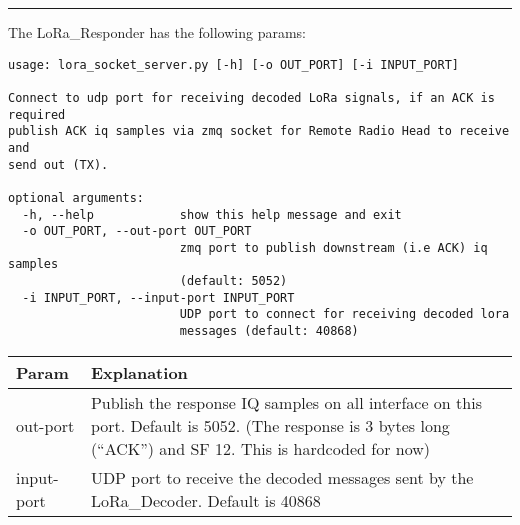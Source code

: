 \begin{center}\rule{0.5\linewidth}{\linethickness}\end{center}

The LoRa\_Responder has the following params:

\begin{verbatim}
usage: lora_socket_server.py [-h] [-o OUT_PORT] [-i INPUT_PORT]

Connect to udp port for receiving decoded LoRa signals, if an ACK is required
publish ACK iq samples via zmq socket for Remote Radio Head to receive and
send out (TX).

optional arguments:
  -h, --help            show this help message and exit
  -o OUT_PORT, --out-port OUT_PORT
                        zmq port to publish downstream (i.e ACK) iq samples
                        (default: 5052)
  -i INPUT_PORT, --input-port INPUT_PORT
                        UDP port to connect for receiving decoded lora
                        messages (default: 40868)

\end{verbatim}

\begin{longtable}[]{@{}ll@{}}
\toprule
\begin{minipage}[b]{0.18\columnwidth}\raggedright\strut
Param\strut
\end{minipage} & \begin{minipage}[b]{0.18\columnwidth}\raggedright\strut
Explanation\strut
\end{minipage}\tabularnewline
\midrule
\endhead
\begin{minipage}[t]{0.18\columnwidth}\raggedright\strut
out-port\strut
\end{minipage} & \begin{minipage}[t]{0.18\columnwidth}\raggedright\strut
Publish the response IQ samples on all interface on this port. Default
is 5052. (The response is 3 bytes long (``ACK'') and SF 12. This is
hardcoded for now)\strut
\end{minipage}\tabularnewline
\begin{minipage}[t]{0.18\columnwidth}\raggedright\strut
input-port\strut
\end{minipage} & \begin{minipage}[t]{0.18\columnwidth}\raggedright\strut
UDP port to receive the decoded messages sent by the LoRa\_Decoder.
Default is 40868\strut
\end{minipage}\tabularnewline
\bottomrule
\end{longtable}

